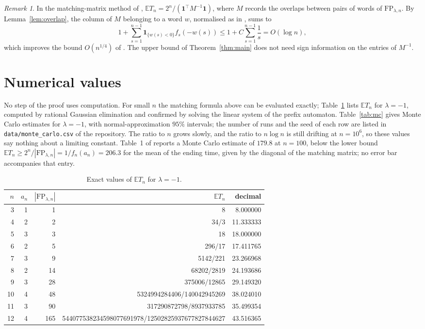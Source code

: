 \documentclass[11pt]{amsart}
\theoremstyle{remark}
\newtheorem{remark}[theorem]{Remark}
\numberwithin{equation}{section}
\newcommand{\EE}{\mathbb{E}}
\newcommand{\FP}{\mathrm{FP}}
\begin{document}
\begin{remark}
In the matching-matrix method of \cite[Section~2.4]{PT}, $\EE T_n=2^n/(\mathbf 1^{\top}M^{-1}\mathbf 1)$, where $M$ records the overlaps between pairs of words of $\FP_{\lambda,n}$. By Lemma~\ref{lem:overlap}, the column of $M$ belonging to a word $w$, normalised as in \cite[(2.1)]{PT}, sums to
\[
1+\sum_{s=1}^{n-1}\mathbf 1_{\{w(s)<0\}}f_s(-w(s))\le1+C\sum_{s=1}^{n-1}\frac1s=O(\log n),
\]
which improves the bound $O(n^{1/4})$ of \cite[(2.23)]{PT}. The upper bound of Theorem~\ref{thm:main} does not need sign information on the entries of $M^{-1}$.
\end{remark}

\section{Numerical values}\label{sec:numerics}

No step of the proof uses computation. For small $n$ the matching formula above can be evaluated exactly; Table~\ref{tab:exact} lists $\EE T_n$ for $\lambda=-1$, computed by rational Gaussian elimination and confirmed by solving the linear system of the prefix automaton. Table~\ref{tab:mc} gives Monte Carlo estimates for $\lambda=-1$, with normal-approximation $95\%$ intervals; the number of runs and the seed of each row are listed in \texttt{data/monte\_carlo.csv} of the repository. The ratio to $n$ grows slowly, and the ratio to $n\log n$ is still drifting at $n=10^6$, so these values say nothing about a limiting constant. Table~1 of \cite{PT} reports a Monte Carlo estimate of $179.8$ at $n=100$, below the lower bound $\EE T_n\ge2^n/|\FP_{\lambda,n}|=1/f_n(a_n)=206.3$ for the mean of the ending time, given by the diagonal of the matching matrix; no error bar accompanies that entry.

\begin{table}[h]
\centering
\begin{tabular}{rrrrr}
\toprule
$n$ & $a_n$ & $|\FP_{\lambda,n}|$ & $\EE T_n$ & decimal\\
\midrule
3 & 1 & 1 & 8 & 8.000000\\
4 & 2 & 2 & 34/3 & 11.333333\\
5 & 3 & 3 & 18 & 18.000000\\
6 & 2 & 5 & 296/17 & 17.411765\\
7 & 3 & 9 & 5142/221 & 23.266968\\
8 & 2 & 14 & 68202/2819 & 24.193686\\
9 & 3 & 28 & 375006/12865 & 29.149320\\
10 & 4 & 48 & 5324994284406/140042945269 & 38.024010\\
11 & 3 & 90 & 317290872798/8937933785 & 35.499354\\
12 & 4 & 165 & 544077538234598077691978/12502825937677827844627 & 43.516365\\
\bottomrule
\end{tabular}
\caption{Exact values of $\EE T_n$ for $\lambda=-1$.}\label{tab:exact}
\end{table}
\end{document}

